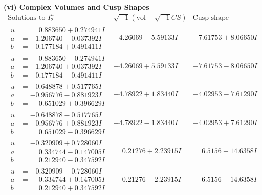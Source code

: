 \documentclass[1p]{elsarticle_modified}
\theoremstyle{definition}
\newcommand{\I}{\sqrt{-1}}
\begin{document}
\newpage\flushleft \textbf{(vi) Complex Volumes and Cusp Shapes}
$$\begin{array}{c|c|c}  
\text{Solutions to }I^u_{2}& \I (\text{vol} + \sqrt{-1}CS) & \text{Cusp shape}\\
 \hline 
\begin{aligned}
u &= \phantom{-}0.883650 + 0.274941 I \\
a &= -1.206740 - 0.037392 I \\
b &= -0.177184 + 0.491411 I\end{aligned}
 & -4.26069 - 5.59133 I & -7.61753 + 8.06650 I \\ \hline\begin{aligned}
u &= \phantom{-}0.883650 - 0.274941 I \\
a &= -1.206740 + 0.037392 I \\
b &= -0.177184 - 0.491411 I\end{aligned}
 & -4.26069 + 5.59133 I & -7.61753 - 8.06650 I \\ \hline\begin{aligned}
u &= -0.648878 + 0.517765 I \\
a &= -0.956776 - 0.881923 I \\
b &= \phantom{-}0.651029 + 0.396629 I\end{aligned}
 & -4.78922 + 1.83440 I & -4.02953 - 7.61290 I \\ \hline\begin{aligned}
u &= -0.648878 - 0.517765 I \\
a &= -0.956776 + 0.881923 I \\
b &= \phantom{-}0.651029 - 0.396629 I\end{aligned}
 & -4.78922 - 1.83440 I & -4.02953 + 7.61290 I \\ \hline\begin{aligned}
u &= -0.320909 + 0.728060 I \\
a &= \phantom{-}0.334744 - 0.147005 I \\
b &= \phantom{-}0.212940 - 0.347592 I\end{aligned}
 & \phantom{-}0.21276 + 2.23915 I & \phantom{-}6.5156 - 14.6358 I \\ \hline\begin{aligned}
u &= -0.320909 - 0.728060 I \\
a &= \phantom{-}0.334744 + 0.147005 I \\
b &= \phantom{-}0.212940 + 0.347592 I\end{aligned}
 & \phantom{-}0.21276 - 2.23915 I & \phantom{-}6.5156 + 14.6358 I \\ \hline\begin{aligned}

\end{aligned}
\end{array}$$
\end{document}
